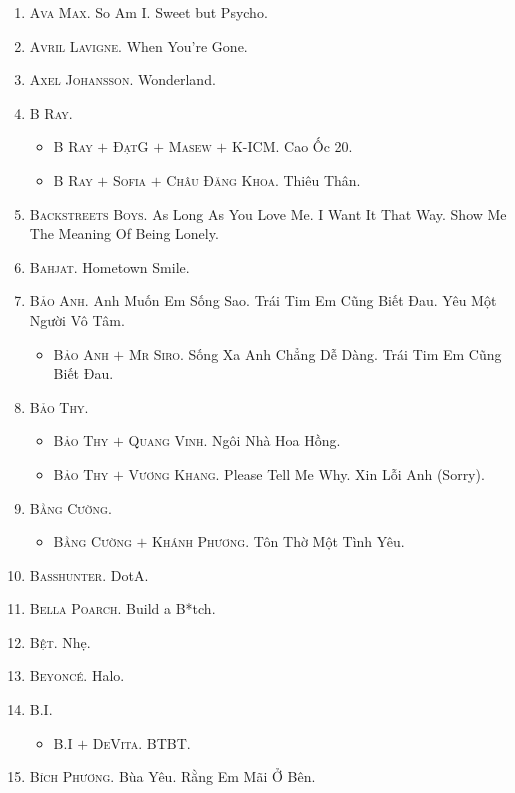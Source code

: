 \documentclass{article}
\numberwithin{equation}{section}
\begin{document}
\begin{enumerate}
\begin{itemize}
	\end{itemize}
	\item \textsc{Ava Max.} So Am I. Sweet but Psycho.	
	\item \textsc{Avril Lavigne.} When You're Gone.
	\item \textsc{Axel Johansson.} Wonderland.
	\item \textsc{B Ray.}
	\begin{itemize}
		\item \textsc{B Ray $+$ ĐạtG $+$ Masew $+$ K-ICM.} Cao Ốc 20.
		\item \textsc{B Ray $+$ Sofia $+$ Châu Đăng Khoa.} Thiêu Thân.
	\end{itemize}
	\item \textsc{Backstreets Boys.} As Long As You Love Me. I Want It That Way. Show Me The Meaning Of Being Lonely.
	\item \textsc{Bahjat.} Hometown Smile.
	\item \textsc{Bảo Anh.} Anh Muốn Em Sống Sao. Trái Tim Em Cũng Biết Đau. Yêu Một Người Vô Tâm.
	\begin{itemize}
		\item \textsc{Bảo Anh $+$ Mr Siro.} Sống Xa Anh Chẳng Dễ Dàng. Trái Tim Em Cũng Biết Đau.
	\end{itemize}
	\item \textsc{Bảo Thy.}
	\begin{itemize}
		\item \textsc{Bảo Thy $+$ Quang Vinh.} Ngôi Nhà Hoa Hồng.
		\item \textsc{Bảo Thy $+$ Vương Khang.} Please Tell Me Why. Xin Lỗi Anh (Sorry).
	\end{itemize}
	\item \textsc{Bằng Cường.}
	\begin{itemize}
		\item \textsc{Bằng Cường $+$ Khánh Phương.} Tôn Thờ Một Tình Yêu.
	\end{itemize}
	\item \textsc{Basshunter.} DotA.
	\item \textsc{Bella Poarch.} Build a B*tch.
	\item \textsc{Bệt.} Nhẹ.
	\item \textsc{Beyonc\'e.} Halo.
	\item \textsc{B.I.}
	\begin{itemize}
		\item \textsc{B.I $+$ DeVita.} BTBT.
	\end{itemize}
	\item \textsc{Bích Phương.} Bùa Yêu. Rằng Em Mãi Ở Bên.

\end{enumerate}
\end{document}
